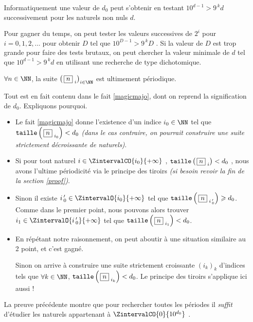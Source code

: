 \begin{remark}
    Informatiquement une valeur de $d_0$ peut s'obtenir en testant $10^{d - 1} > 9^{\,k} d$ successivement pour les naturels non nuls $d$.


    \medskip

    Pour gagner du temps, on peut tester les valeurs successives de $2^i$ pour $i = 0, 1, 2, \dots$ pour obtenir $D$ tel que $10^{D - 1} > 9^{\,k} D$ . Si la valeur de $D$ est trop grande pour faire des tests brutaux, on peut chercher la valeur minimale de $d$ tel que $10^{d - 1} > 9^{\,k} d$ en utilisant une recherche de type dichotomique.
\end{remark}


\medskip

\begin{fact}\label{beautifulproof}
    $\forall n \in \NN$, la suite $\left( \, \sqseq{n}{i} \right)_{i \in \NN}$ est ultimement périodique.
\end{fact}

\begin{proof*}
    Tout est en fait contenu dans le fait \ref{magicmajo}, dont on reprend la signification de $d_0$. Expliquons pourquoi.
    \begin{itemize}[label = \textbullet]
        \item Le fait \ref{magicmajo} donne l'existence d'un indice $i_0 \in \NN$ tel que $\operatorname{\text{\normalfont\texttt{taille}}}\left( \, \fbox{$n$}_{\,\,i_0} \right) < d_0$ \emph{(dans le cas contraire, on pourrait construire une suite strictement décroissante de naturels)}.

        \item Si pour tout naturel $i \in \ZintervalCO{i_0}{+\infty}$ , $\operatorname{\text{\normalfont\texttt{taille}}}\left( \, \fbox{$n$}_{\,\,i} \right) < d_0$ , nous avons l'ultime périodicité via le principe des tiroirs \emph{(si besoin revoir la fin de la section \ref{proof})}.

        \item Sinon il existe $i\,^\prime_0 \in \ZintervalO{i_0}{+\infty}$ tel que $\operatorname{\text{\normalfont\texttt{taille}}}\left( \, \fbox{$n$}_{\,\,i\,^\prime_0} \right) \geqslant d_0$. Comme dans le premier point, nous pouvons alors trouver $i_1 \in \ZintervalO{i\,^\prime_0}{+\infty}$ tel que $\operatorname{\text{\normalfont\texttt{taille}}}\left( \, \fbox{$n$}_{\,\,i_1} \right) < d_0$.

        \item En répétant notre raisonnement,
        on peut aboutir à une situation similaire au 2\ieme{} point, et c'est gagné.

        \noindent
        Sinon on arrive à construire une suite strictement croissante $\left( i_k \right)_k$ d'indices tels que $\forall k \in \NN$, $\operatorname{\text{\normalfont\texttt{taille}}}\left( \, \fbox{$n$}_{\,\,i_k} \right) < d_0$. Le principe des tiroirs s'applique ici aussi !
    \end{itemize}
\end{proof*}



\medskip

\begin{remark}
    La preuve précédente montre que pour rechercher toutes les périodes il \emph{\og suffit \fg} d'étudier les naturels appartenant à $\ZintervalCO{0}{10^{d_0}}$ .
\end{remark}
